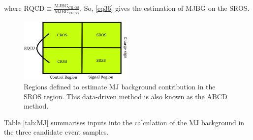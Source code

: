 where $\text{RQCD}\equiv\frac{\text{MJBG}_{\text{CR OS}}}{\text{MJBG}_{\text{CR SS}}}$. So, \eqref{eq36} gives the estimation of MJBG on the SROS.
\begin{figure}[htbp]
	\centering
	\includegraphics[width=0.5\textwidth]{figures/Fig7.png}
	\caption{Regions defined to estimate MJ background contribution in the SROS region. This data-driven method is also known as the ABCD method.}
	\label{Fig7}
\end{figure}
Table \ref{tab:MJ} summarises inputs into the calculation of the MJ background in the three candidate event samples. 

